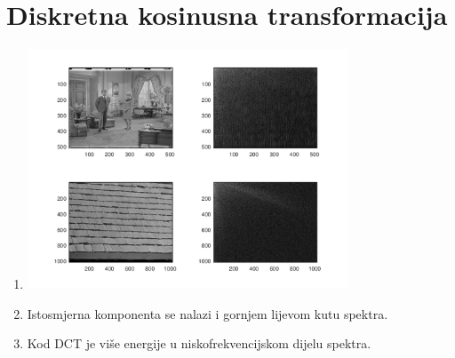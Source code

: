 \documentclass[12pt, a4]{report}
\begin{document}
        \section{Diskretna kosinusna transformacija}
            \begin{enumerate}
                \item
                    \begin{minipage}{\linewidth}
                        \centering
                        \includegraphics[width=0.75\textwidth]{cosine}
                    \end{minipage}
                \item
                    Istosmjerna komponenta se nalazi i gornjem lijevom kutu spektra.
                \item
                    Kod DCT je više energije u niskofrekvencijskom dijelu spektra.
            \end{enumerate}
\end{document}
